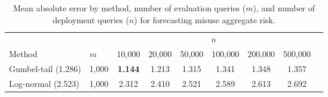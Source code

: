 \begin{table}[h]
\centering
\begin{tabular}{llccccccc}
\toprule
& & \multicolumn{6}{c}{$n$} \\
Method & $m$ & 10,000 & 20,000 & 50,000 & 100,000 & 200,000 & 500,000 \\
\midrule
Gumbel-tail (1.286) & 1,000 & \textbf{1.144} & 1.213 & 1.315 & 1.341 & 1.348 & 1.357 \\
Log-normal (2.523) & 1,000 & 2.312 & 2.410 & 2.521 & 2.589 & 2.613 & 2.692 \\
\bottomrule
\end{tabular}
\caption{Mean absolute error by method, number of evaluation queries ($m$), and number of deployment queries ($n$) for forecasting misuse aggregate risk.}
\label{tab:all-ground-truth}
\end{table}


